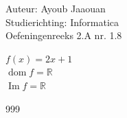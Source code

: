 \documentclass[a4paper]{article}
\begin{document}
  
\noindent \large Auteur: Ayoub Jaaouan          \\
\noindent \large Studierichting: Informatica   \\ 
\noindent \large Oefeningenreeks 2.A nr. 1.8   \\

\medskip

\normalsize



$f(x) = 2x+1$\\

$\operatorname{dom}f = \mathbb{R}$\\

$\operatorname{Im}f = \mathbb{R}$\\






\begin{thebibliography}{999}
\end{thebibliography}
\end{document}
